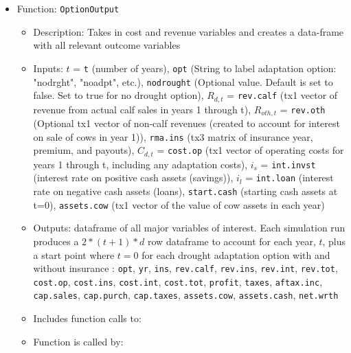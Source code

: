 \documentclass[11pt]{article}
\begin{document}
\begin{itemize}
\item Function: \verb!OptionOutput!
	\begin{itemize}
	\item Description: Takes in cost and revenue variables and creates a data-frame with all relevant outcome variables
	\item Inputs: $t$ = \verb!t! (number of years), \verb!opt! (String to label adaptation option: "nodrght", "noadpt", etc.),  \verb!nodrought! (Optional value. Default is set to false. Set to true for no drought option), $R_{d,t}$ = \verb!rev.calf! (tx1 vector of revenue from actual calf sales in years 1 through t), $R_{oth,t}$ = \verb!rev.oth! (Optional tx1 vector of non-calf revenues (created to account for interest on sale of cows in year 1)), \verb!rma.ins! (tx3 matrix of insurance year, premium, and payouts), $C_{d,t}$ = \verb!cost.op! (tx1 vector of operating costs for years 1 through t, including any adaptation costs), $i_s$ = \verb!int.invst! (interest rate on positive cash assets (savings)), $i_l$ = \verb!int.loan! (interest rate on negative cash assets (loans), \verb!start.cash! (starting cash assets at t=0), \verb!assets.cow! (tx1 vector of the value of cow assets in each year)
	\item  Outputs: dataframe of all major variables of interest. Each simulation run produces a $2*(t+1)*d$ row dataframe to account for each year, $t$, plus a start point where $t=0$ for each drought adaptation option with and without insurance : \verb!opt!, \verb!yr!, \verb!ins!, \verb!rev.calf!, \verb!rev.ins!, \verb!rev.int!, \verb!rev.tot!, \verb!cost.op!, \verb!cost.ins!, \verb!cost.int!, \verb!cost.tot!, \verb!profit!, \verb!taxes!, \verb!aftax.inc!, \verb!cap.sales!, \verb!cap.purch!, \verb!cap.taxes!, \verb!assets.cow!, \verb!assets.cash!, \verb!net.wrth!
	\item Includes function calls to:
	\item Function is called by: 
	\end{itemize}
\end{itemize}
\end{document}

